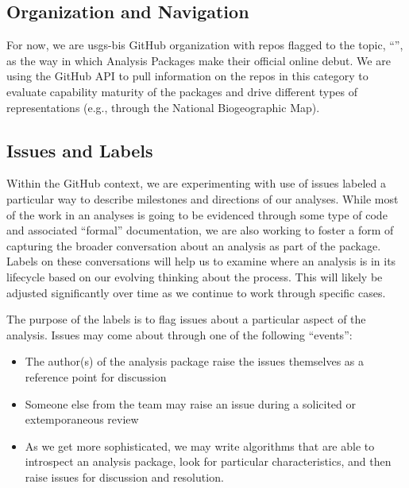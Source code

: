 \documentclass[letterpaper,10pt,english]{sphinxmanual}
\begin{document}
\subsection{Organization and Navigation}
\label{\detokenize{baps:organization-and-navigation}}
For now, we are usgs-bis GitHub organization with repos flagged to the topic, “”, as the way in which Analysis Packages make their official online debut. We are using the GitHub API to pull information on the repos in this category to evaluate capability maturity of the packages and drive different types of representations (e.g., through the National Biogeographic Map).


\subsection{Issues and Labels}
\label{\detokenize{baps:issues-and-labels}}
Within the GitHub context, we are experimenting with use of issues labeled a particular way to describe milestones and directions of our analyses. While most of the work in an analyses is going to be evidenced through some type of code and associated “formal” documentation, we are also working to foster a form of capturing the broader conversation about an analysis as part of the package. Labels on these conversations will help us to examine where an analysis is in its lifecycle based on our evolving thinking about the process. This will likely be adjusted significantly over time as we continue to work through specific cases.

The purpose of the labels is to flag issues about a particular aspect of the analysis. Issues may come about through one of the following “events”:
\begin{itemize}
\item {} 
The author(s) of the analysis package raise the issues themselves as a reference point for discussion

\item {} 
Someone else from the team may raise an issue during a solicited or extemporaneous review

\item {} 
As we get more sophisticated, we may write algorithms that are able to introspect an analysis package, look for particular characteristics, and then raise issues for discussion and resolution.

\end{itemize}
\end{document}

